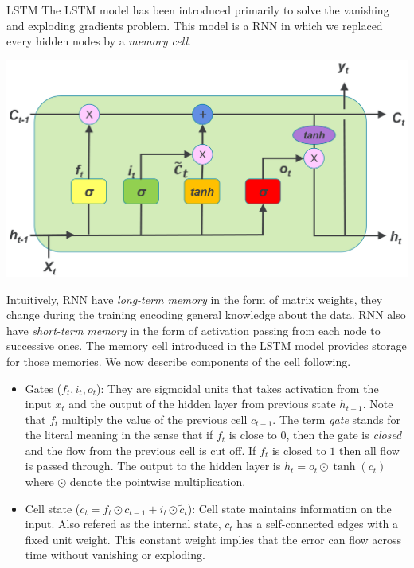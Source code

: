 \documentclass[final]{beamer}
\newlength{\colwidth}
\begin{document}
\begin{frame}[t]
\begin{columns}[t]
\begin{column}{\colwidth}
\begin{block}{LSTM}
The LSTM model has been introduced primarily to solve the vanishing and
exploding gradients problem. This model is a RNN in which we replaced every
hidden nodes by a \textit{memory cell}.  \begin{center}
    \includegraphics[width = 0.7\linewidth]{lstm.png}
\end{center}

Intuitively, RNN have \textit{long-term memory} in the form of matrix weights,
they change during the training encoding general knowledge about the data. RNN
also have \textit{short-term memory} in the form of activation passing from
each node to successive ones. The memory cell introduced in the LSTM model
provides storage for those memories. We now describe components of the cell
following.\cite{review}

\begin{center}
    \begin{itemize}
    \item Gates ($f_t, i_t, o_t$): They are sigmoidal units that takes
      activation from the input $x_t$ and the output of the hidden layer from
      previous state $h_{t-1}$. Note that $f_t$ multiply the value of the
      previous cell $c_{t-1}$. The term \textit{gate} stands for the literal
      meaning in the sense that if $f_{t}$ is close to $0$, then the gate is
      \textit{closed} and the flow from the previous cell is cut off. If $f_t$
      is closed to $1$ then all flow is passed through. The output to the
      hidden layer is $h_t = o_t \odot \tanh(c_t)$ where $\odot$ denote the
      pointwise multiplication.
    \item Cell state ($c_t = f_t \odot c_{t-1} + i_t \odot \tilde{c}_t$): Cell
    state maintains information on the input. Also refered as the internal state,
    $c_t$ has a self-connected edges with a fixed unit weight. This constant
    weight implies that the error can flow across time without vanishing or
    exploding. 
\end{itemize}
\end{center}


\end{block}
\end{column}
\end{columns}
\end{frame}
\end{document}
